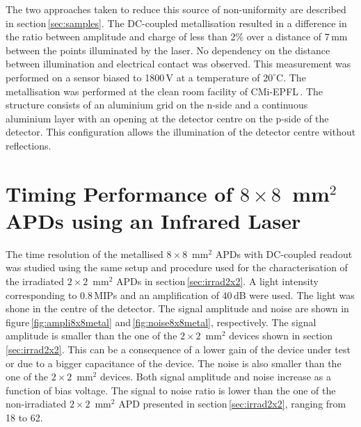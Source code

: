 \documentclass[3p,preprint,twocolumn]{elsarticle}
\begin{document}
The two approaches taken to reduce this source of non-uniformity are described in section\,\ref{sec:samples}.
The DC-coupled metallisation resulted in a difference in the ratio between amplitude and charge of less than 2\% over a distance of 7\,mm between the points illuminated by the laser.
No dependency on the distance between illumination and electrical contact was observed.
This measurement was performed on a sensor biased to 1800\,V at a temperature of $20^\circ$C.
The metallisation was performed at the clean room facility of CMi-EPFL\,\cite{cmi}.
The structure consists of an aluminium grid on the n-side and a continuous aluminium layer with an opening at the detector centre on the p-side of the detector.
This configuration allows the illumination of the detector centre without reflections.

\section{Timing Performance of $8 \times 8$~mm$^2$ APDs using an Infrared Laser}
\label{sec:timing8x8laser}

The time resolution of the metallised $8 \times 8$~mm$^2$ APDs with DC-coupled readout was studied using the same setup and procedure used for the characterisation of the irradiated $2 \times 2$~mm$^2$ APDs in section\,\ref{sec:irrad2x2}.
A light intensity corresponding to 0.8\,MIPs and an amplification of 40\,dB were used.
The light was shone in the centre of the detector.
The signal amplitude and noise are shown in figure\,\ref{fig:ampli8x8metal} and\,\ref{fig:noise8x8metal}, respectively.
The signal amplitude is smaller than the one of the $2 \times 2$~mm$^2$ devices shown in section\,\ref{sec:irrad2x2}.
This can be a consequence of a lower gain of the device under test or due to a bigger capacitance of the device.
The noise is also smaller than the one of the $2 \times 2$~mm$^2$ devices.
Both signal amplitude and noise increase as a function of bias voltage.
The signal to noise ratio is lower than the one of the non-irradiated $2 \times 2$~mm$^2$ APD presented in section\,\ref{sec:irrad2x2}, ranging from 18 to 62.
\end{document}
